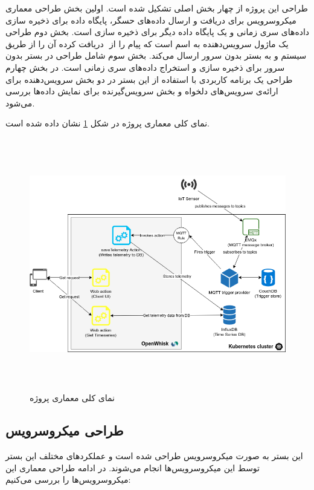 طراحی این پروژه از چهار بخش اصلی تشکیل شده است. اولین بخش طراحی معماری میکروسرویس  برای دریافت و ارسال داده‌های حسگر، پایگاه داده برای ذخیره سازی داده‌های سری زمانی و یک پایگاه داده دیگر برای ذخیره سازی  است. بخش دوم طراحی یک ماژول سرویس‌دهنده به اسم  است که پیام را از ‌ دریافت کرده آن را از طریق سیستم  و  به بستر بدون سرور ارسال می‌کند. بخش سوم شامل طراحی  در بستر بدون سرور  برای ذخیره سازی و استخراج داده‌های سری زمانی است. در بخش چهارم طراحی یک برنامه کاربردی با استفاده از این بستر در دو بخش سرویس‌دهنده برای ارائه‌ی سرویس‌های دلخواه و بخش سرویس‌گیرنده برای نمایش داده‌ها بررسی می‌شود.
\newline

نمای کلی معماری پروژه در شکل \ref{platformArchitecture} نشان داده شده است.
\newline

\begin{figure}[!h]
	\centering
	\includegraphics[height=11cm]{images/platform-architecture-1}
	\caption{نمای کلی معماری پروژه}
	\label{platformArchitecture}
\end{figure}

\subsection{طراحی میکروسرویس}

این بستر به صورت میکروسرویس طراحی شده است و عملکردهای مختلف این بستر توسط این میکروسرویس‌ها انجام می‌شوند. در ادامه طراحی معماری این میکروسرویس‌ها را بررسی می‌کنیم:


